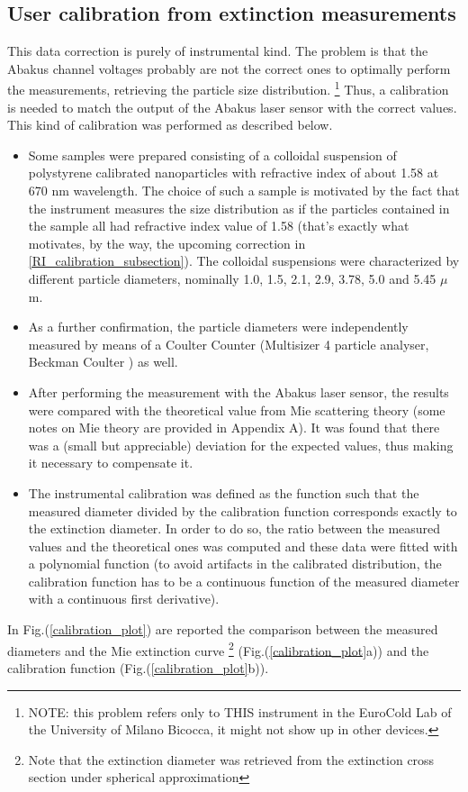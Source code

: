 \documentclass[a4paper, 11pt]{report}
\begin{document}
\subsection{User calibration from extinction measurements}
\label{ext_calibration_subsection}

This data correction is purely of instrumental kind. The problem is that the Abakus channel voltages probably are not the correct ones to optimally perform the measurements, retrieving the particle size distribution. \footnote{NOTE: this problem refers only to THIS instrument in the EuroCold Lab of the University of Milano Bicocca, it might not show up in other devices.}
Thus, a calibration is needed to match the output of the Abakus laser sensor with the correct values. 
This kind of calibration was performed as described below. 
\begin{itemize}
\item Some samples were prepared consisting of a colloidal suspension of polystyrene calibrated nanoparticles with refractive index of about 1.58 at 670 nm wavelength. The choice of such a sample is motivated by the fact that the instrument measures the size distribution as if the particles contained in the sample all had refractive index value of 1.58 (that's exactly what motivates, by the way, the upcoming correction in \ref{RI_calibration_subsection}). 
The colloidal suspensions were characterized by different particle diameters, nominally 1.0, 1.5, 2.1, 2.9, 3.78, 5.0 and 5.45 $\mu$m.
\item As a further confirmation, the particle diameters were independently measured by means of a Coulter Counter (Multisizer 4 particle analyser, Beckman Coulter \cite{CC}) as well.
\item After performing the measurement with the Abakus laser sensor, the results were compared with the theoretical value from Mie scattering theory (some notes on Mie theory are provided in Appendix A). 
It was found that there was a (small but appreciable) deviation for the expected values, thus making it necessary to compensate it.
\item The instrumental calibration was defined as the function such that the measured diameter divided by the calibration function corresponds exactly to the extinction diameter. In order to do so, the ratio between the measured values and the theoretical ones was computed and these data were fitted with a polynomial function (to avoid artifacts in the calibrated distribution, the calibration function has to be a continuous function of the measured diameter with a continuous first derivative).
\end{itemize}
In Fig.(\ref{calibration_plot}) are reported the comparison between the measured diameters and the Mie extinction curve \footnote{Note that the extinction diameter was retrieved from the extinction cross section under spherical approximation} (Fig.(\ref{calibration_plot}a)) and the calibration function  (Fig.(\ref{calibration_plot}b)).
\end{document}
